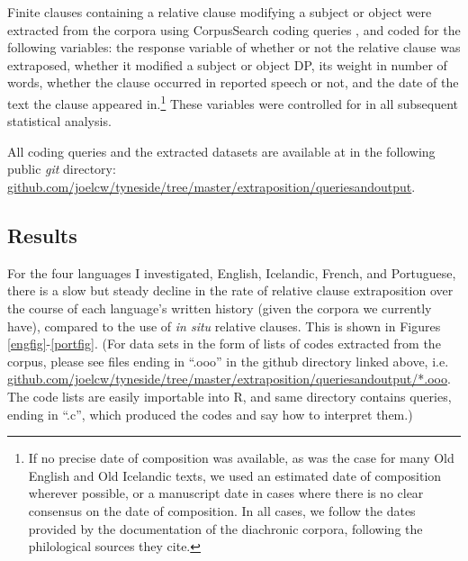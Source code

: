 Finite clauses containing a relative clause modifying a subject or object were extracted from the corpora using CorpusSearch coding queries \citep{corpussearch}, and coded for the following variables: the response variable of whether or not the relative clause was extraposed, whether it modified a subject or object DP, its weight in number of words, whether the clause occurred in reported speech or not, and the date of the text the clause appeared in.\footnote{If no precise date of composition was available, as was the case for many Old English and Old Icelandic texts, we used an estimated date of composition wherever possible, or a manuscript date in cases where there is no clear consensus on the date of composition. In all cases, we follow the dates provided by the documentation of the diachronic corpora, following the philological sources they cite.} These variables were controlled for in all subsequent statistical analysis.


All coding queries and the extracted datasets are available at in the following public \textsl{git} directory: \url{github.com/joelcw/tyneside/tree/master/extraposition/queriesandoutput}.






\subsection{Results}
\label{results}

For the four languages I investigated, English, Icelandic, French, and Portuguese, there is a slow but steady decline in the rate of relative clause extraposition over the course of each language's written history (given the corpora we currently have), compared to the use of \textsl{in situ} relative clauses. This is shown in Figures \ref{engfig}-\ref{portfig}. (For data sets in the form of lists of codes extracted from the corpus, please see files ending in ``.ooo'' in the github directory linked above, i.e. \url{github.com/joelcw/tyneside/tree/master/extraposition/queriesandoutput/*.ooo}. The code lists are easily importable into R, and same directory contains queries, ending in ``.c'', which produced the codes and say how to interpret them.)

